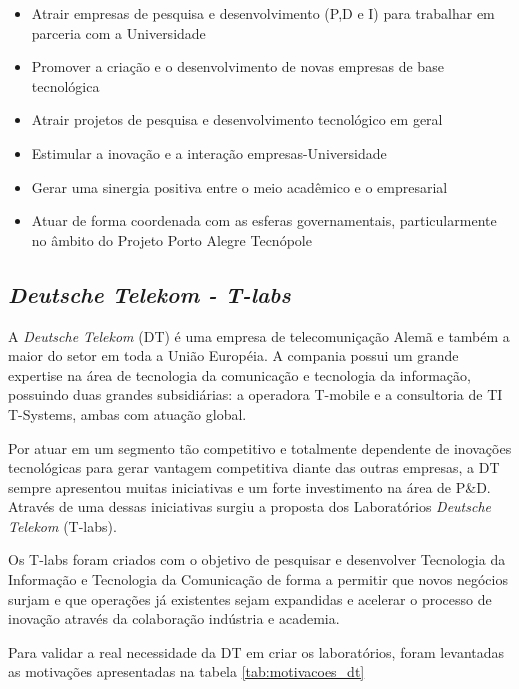 \begin{itemize}
\item Atrair empresas de pesquisa e desenvolvimento (P,D e I) para trabalhar em parceria com a Universidade
\item Promover a criação e o desenvolvimento de novas empresas de base tecnológica
\item Atrair projetos de pesquisa e desenvolvimento tecnológico em geral
\item Estimular a inovação e a interação empresas-Universidade
\item Gerar uma sinergia positiva entre o meio acadêmico e o empresarial
\item Atuar de forma coordenada com as esferas governamentais, particularmente no âmbito do Projeto Porto Alegre Tecnópole
\end{itemize}

\subsection{\textit{Deutsche Telekom - T-labs}}

A \textit{Deutsche Telekom} (DT) é uma empresa de telecomuniçação Alemã e também a maior do setor em toda a União Européia. A compania possui um grande expertise na área de tecnologia da comunicação e tecnologia da informação, possuindo duas grandes subsidiárias: a operadora T-mobile e a consultoria de TI T-Systems, ambas com atuação global.

Por atuar em um segmento tão competitivo e totalmente dependente de inovações tecnológicas para gerar vantagem competitiva diante das outras empresas, a DT sempre apresentou muitas iniciativas e um forte investimento na área de P\&D. Através de uma dessas iniciativas surgiu a proposta dos Laboratórios \textit{Deutsche Telekom} (T-labs).

Os T-labs foram criados com o objetivo de pesquisar e desenvolver Tecnologia da Informação e Tecnologia da Comunicação de forma a permitir que novos negócios surjam e que operações já existentes sejam expandidas e acelerar o processo de inovação através da colaboração indústria e academia. \cite{dtlabs}

Para validar a real necessidade da DT em criar os laboratórios, foram levantadas as motivações apresentadas na tabela \ref{tab:motivacoes_dt}

